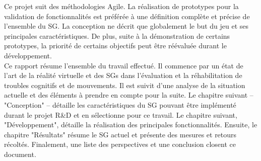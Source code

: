 Ce projet suit des méthodologies Agile. La réalisation de prototypes pour la validation de fonctionnalités est préférée à une définition complète et précise de l'ensemble du SG. La conception ne décrit que globalement le but du jeu et ses principales caractéristiques. De plus, suite à la démonstration de certains prototypes, la priorité de certains objectifs peut être réévaluée durant le développement.
\\

Ce rapport résume l'ensemble du travail effectué. Il commence par un état de l'art de la réalité virtuelle et des SGs dans l'évaluation et la réhabilitation de troubles cognitifs et de mouvements. Il est suivit d'une analyse de la situation actuelle et des éléments à prendre en compte pour la suite. Le chapitre suivant -- "Conception" -- détaille les caractéristiques du SG pouvant être implémenté durant le projet R\&D et en sélectionne pour ce travail. Le chapitre suivant, "Développement", détaille la réalisation des principales fonctionnalités. Ensuite, le chapitre "Résultats" résume le SG actuel et présente des mesures et retours récoltés. Finalement, une liste des perspectives et une conclusion closent ce document.